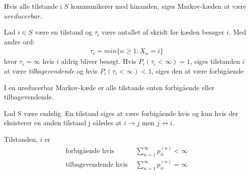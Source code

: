 \begin{minipage}\textwidth
\begin{defn}\textbf{} %
\newline
Hvis alle tilstande i $S$ kommunikerer med hinanden, siges Markov-kæden at være $ureducerbar$.
\end{defn}
\end{minipage}


\begin{minipage}\textwidth
\begin{defn}\textbf{} %
\newline
Lad $i\in S$ være en tilstand og $\tau_i$ være antallet af skridt før kæden besøger $i$. Med andre ord:
\begin{align*}
    \tau_i=min\{n\geq1:X_n=i\}
\end{align*}
hvor $\tau_i=\infty$ hvis $i$ aldrig bliver besøgt. Hvis $P_i(\tau_i<\infty)=1$, siges tilstanden $i$ at være \textit{tilbagevendende} og hvis $P_i(\tau_i<\infty)<1$, siges den at være forbigående
\end{defn}
\end{minipage}



\begin{minipage}\textwidth
\begin{kor} \textbf{} %
\newline
I en ureducerbar Markov-kæde er alle tilstande enten forbigående eller tilbagevendende.
\end{kor}
\end{minipage}

\begin{minipage}\textwidth
\begin{kor} \textbf{} %
\newline
Lad S være endelig. En tilstand siges at være forbigående hvis og kun hvis der eksisterer en anden tilstand j således at $i \to j$ men $j \not\to i.$
\end{kor}
\end{minipage}

\begin{minipage}\textwidth
\begin{pro} \textbf{} %
\newline
Tilstanden, $i$ er
\begin{align*}
    \text{forbigående hvis }  &\sum_{n=1}^\infty p_{ii}^{(n)}<\infty\\
    \text{tilbagevendende hvis } &\sum_{n=1}^\infty p_{ii}^{(n)}=\infty\\
\end{align*}
\end{pro}
\end{minipage}


